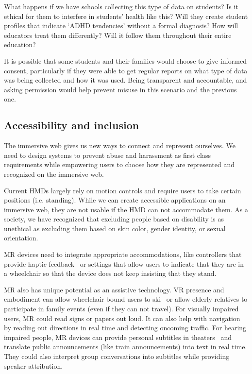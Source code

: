 What happens if we have schools collecting this type of data on students? Is it ethical for them to interfere in students' health like this? Will they create student profiles that indicate `ADHD tendencies' without a formal diagnosis? How will educators treat them differently? Will it follow them throughout their entire education?

It is possible that some students and their families would choose to give informed consent, particularly if they were able to get regular reports on what type of data was being collected and how it was used. Being transparent and accountable, and asking permission would help prevent misuse in this scenario and the previous one.


\subsection{Accessibility and inclusion}

The immersive web gives us new ways to connect and represent ourselves. We need to design systems to prevent abuse and harassment as first class requirements while empowering users to choose how they are represented and recognized on the immersive web.

Current HMDs largely rely on motion controls and require users to take certain positions (i.e. standing). While we can create accessible applications on an immersive web, they are not usable if the HMD can not accommodate them. As a society, we have recognized that excluding people based on disability is as unethical as excluding them based on skin color, gender identity, or sexual orientation.

MR devices need to integrate appropriate accommodations, like controllers that provide haptic feedback~\cite{zhao2018demonstration} or settings that allow users to indicate that they are in a wheelchair so that the device does not keep insisting that they stand.

MR also has unique potential as an assistive technology. VR presence and embodiment can allow wheelchair bound users to ski~\cite{harrell} or allow elderly relatives to participate in family events (even if they can not travel). For visually impaired users, MR could read signs or papers out loud. It can also help with navigation by reading out directions in real time and detecting oncoming traffic. For hearing impaired people, MR devices can provide personal subtitles in theaters~\cite{forrest} and translate public announcements (like train announcements) into text in real time. They could also interpret group conversations into subtitles while providing speaker attribution.

